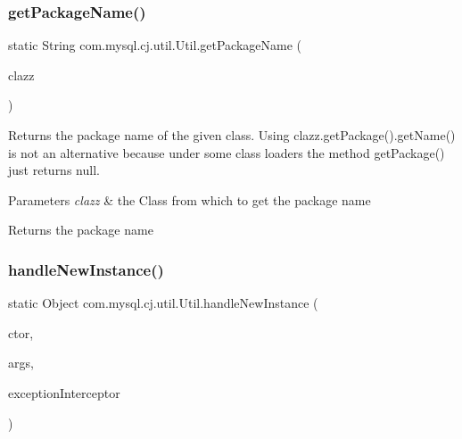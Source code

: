 \mbox{\label{classcom_1_1mysql_1_1cj_1_1util_1_1_util_a142027940787b4d09dc21ea4c5de617e}} 
\subsubsection{\texorpdfstring{get\+Package\+Name()}{getPackageName()}}
{\footnotesize\ttfamily static String com.\+mysql.\+cj.\+util.\+Util.\+get\+Package\+Name (\begin{DoxyParamCaption}\item[{Class$<$?$>$}]{clazz }\end{DoxyParamCaption})\hspace{0.3cm}{\ttfamily [static]}}

Returns the package name of the given class. Using clazz.\+get\+Package().get\+Name() is not an alternative because under some class loaders the method get\+Package() just returns null.


\begin{DoxyParams}{Parameters}
{\em clazz} & the Class from which to get the package name \\
\hline
\end{DoxyParams}
\begin{DoxyReturn}{Returns}
the package name 
\end{DoxyReturn}
\mbox{\label{classcom_1_1mysql_1_1cj_1_1util_1_1_util_a6c3f08276e2a1f6721540f24e1996167}} 
\subsubsection{\texorpdfstring{handle\+New\+Instance()}{handleNewInstance()}}
{\footnotesize\ttfamily static Object com.\+mysql.\+cj.\+util.\+Util.\+handle\+New\+Instance (\begin{DoxyParamCaption}\item[{Constructor$<$?$>$}]{ctor,  }\item[{Object \mbox{[}$\,$\mbox{]}}]{args,  }\item[{\mbox{\hyperlink{interfacecom_1_1mysql_1_1cj_1_1exceptions_1_1_exception_interceptor}{Exception\+Interceptor}}}]{exception\+Interceptor }\end{DoxyParamCaption})\hspace{0.3cm}{\ttfamily [static]}}

